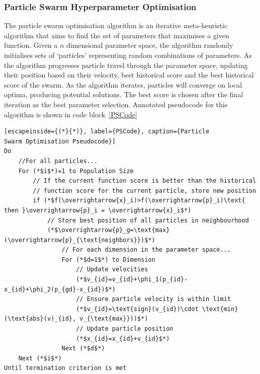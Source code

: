 \documentclass[titlepage, 12pt]{scrartcl} \usepackage{enumitem}
\begin{document}
\subsubsection{Particle Swarm Hyperparameter Optimisation}\label{PSOp}
The particle swarm optimisation algorithm is an iterative meta-heuristic algorithm that
aims to find the set of parameters that maximises a given function. Given a
$n$ dimensional parameter space, the algorithm randomly initialises sets of
`particles' representing random combinations of parameters. As the algorithm
progresses particle travel through the parameter space, updating their
position based on their velocity, best historical score and the best historical
score of the swarm. As the algorithm iterates, particles will converge on local
optima, producing potential solutions. The best score is chosen after the final
iteration as the best parameter selection. Annotated pseudocode for this
algorithm is shown in code block~\ref{PSCode}~\parencite{Clerc2002}

\pagebreak
\onehalfspacing
\begin{lstlisting}[escapeinside={(*}{*)}, label={PSCode}, caption={Particle
Swarm Optimisation Pseudocode}]
Do
    //For all particles...
    For (*$i$*)=1 to Population Size
        // If the current function score is better than the historical
        // function score for the current particle, store new position
        if (*$f(\overrightarrow{x}_i)>f(\overrightarrow{p}_i)\text{ then }\overrightarrow{p}_i = \overrightarrow{x}_i$*)
            // Store best position of all particles in neighbourhood
            (*$\overrightarrow{p}_g=\text{max}(\overrightarrow{p}_{\text{neighbors}})$*)
                // For each dimension in the parameter space...
                For (*$d=1$*) to Dimension
                    // Update velocities
                    (*$v_{id}=v_{id}+\phi_1(p_{id}-x_{id}+\phi_2(p_{gd}-x_{id})$*)
                    // Ensure particle velocity is within limit
                    (*$v_{id}=\text{sign}(v_{id})\cdot \text{min}(\text{abs}(v)_{id}, v_{\text{max}}))$*)
                    // Update particle position
                    (*$x_{id}=x_{id}+v_{id}$*)
                Next (*$d$*)
    Next (*$i$*)
Until termination criterion is met
\end{lstlisting}
\doublespacing
\end{document}
